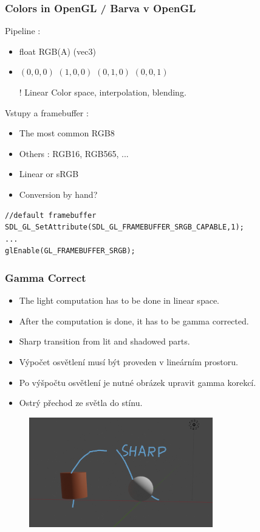 \begin{frame}[fragile]
    \frametitle{Colors in OpenGL / Barva v OpenGL}

    Pipeline :
    \begin{itemize}
        \item float RGB(A) (vec3)
        \item {\color{black}$(0,0,0)$ \color{red}$(1,0,0)$ \color{green}$(0,1,0)$ \color{blue}$(0,0,1)$}
        \item[\color{red}!] Linear Color space, interpolation, blending.
    \end{itemize}
    \pause\vfill
    Vstupy a framebuffer :
    \begin{itemize}
        \item The most common RGB8
        \item Others : RGB16, RGB565, ...
        \item Linear or sRGB
        \item Conversion by hand?
    \end{itemize}
\begin{verbatim}
//default framebuffer
SDL_GL_SetAttribute(SDL_GL_FRAMEBUFFER_SRGB_CAPABLE,1);
...
glEnable(GL_FRAMEBUFFER_SRGB);
\end{verbatim}
\end{frame}

\begin{frame}[fragile]
\frametitle{Gamma Correct}
	\begin{itemize}
  \item The light computation has to be done in linear space.
  \item After the computation is done, it has to be gamma corrected.
  \item Sharp transition from lit and shadowed parts.
  \item Výpočet osvětlení musí být proveden v lineárním prostoru.
  \item Po výšpočtu osvětlení je nutné obrázek upravit gamma korekcí.
  \item Ostrý přechod ze světla do stínu.
	\end{itemize}
	\begin{figure}[h]
	\includegraphics[width=8cm,keepaspectratio]{pics/color/gamma_correct}
	\end{figure}
\end{frame}

